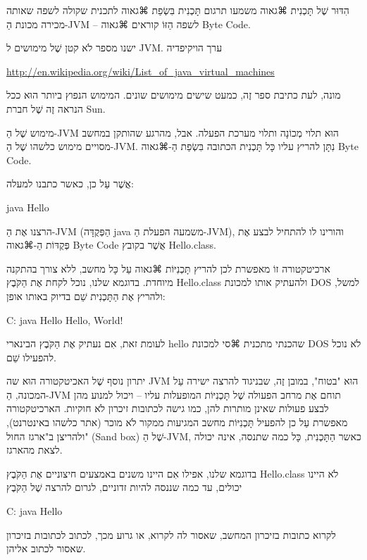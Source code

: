 הִדּוּר שֶׁל תָּכְנִית ⌘גאוה משמעו תרגום תָּכְנִית בִּשְׂפַת ⌘גאוה לתכנית שקולה
לשפה שאותה מכירה מכונת הַ-JVM – לשפה הַזּוֹ קוראים ⌘גאוה Byte Code.

ישנו מספר לֹא קטן שֶׁל מימושים ל JVM. ערך הויקיפדיה
\begin{english}
\url{http://en.wikipedia.org/wiki/List_of_java_virtual_machines}
\end{english}

מונה, לעת כתיבת ספר זֶה, כמעט שישים מימושים שונים. המימוש הנפוץ ביותר הוּא ככל
הנראה זֶה שֶׁל חברת Sun.

מימוש שֶׁל הַ-JVM הוּא תלוי מְכוֹנָה ותלוי מערכת הפעלה. אבל, מהרגע שהותקן במחשב
מסויים מימוש כלשהו שֶׁל הַ-JVM. נִתָּן להריץ עליו כָּל תָּכְנִית הכתובה
בִּשְׂפַת הַ-⌘גאוה Byte Code.



אֲשֶׁר עַל כן, כאשר כתבנו למעלה:

java Hello
\END

הרצנו אֶת הַ-JVM (הַפְּקֻדָּה java משמעה הפעלת הַ-JVM), והורינו לו להתחיל לבצע
אֶת פְּקֻדּוֹת הַ-⌘גאוה Byte Code אֲשֶׁר בקובץ Hello.class.

ארכיטקטורה זוֹ מאפשרת לכן להריץ תָּכְנִיּוֹת ⌘גאוה עַל כָּל מחשב, ללא צורך בהתקנה
מיוחדת. בדוגמא שלנו, נוכל לקחת אֶת הַקֹּבֶץ  Hello.class ולהעתיק אותו למכונת DOS
למשל, ולהריץ אֶת הַתָּכְנִית שֵׁם בדיוק באותו אופן:


\begin{NONE}
C:\> java Hello
Hello, World!
\end{NONE}

לעומת זאת, אִם נעתיק אֶת הַקֹּבֶץ הבינארי hello שהכנתי מתכנית  ⌘סי למכונת DOS לֹא
נוכל להפעילו שֵׁם.

יתרון נוסף שֶׁל האכיטקטורה הוּא שה JVM הוּא "בטוח", במובן זֶה, שבניגוד להרצה
ישירה עַל המכונה, הַ-JVM תוחם אֶת מרחב הפעולה שֶׁל תָּכְנִיּוֹת המופעלות עליו –
ויכול למנוע מהן לבצע פעולות שאינן מותרות להן, כמו גישה לכתובות זיכרון לֹא
חוקיות. הארכיטקטורה מאפשרת עַל כן להפעיל תָּכְנִיּוֹת מחשב המגיעות ממקור לֹא
מוכר (אתר כלשהו באינטרנט), ולהריצן ב"ארגז החול" (Sand box) שֶׁל הַ-JVM, כאשר
הַתָּכְנִית, כָּל כמה שתנסה, אינה יכולה לצאת מהארגז.

בדוגמא שלנו, אפילו אִם היינו משנים באמצעים חיצוניים אֶת הַקֹּבֶץ Hello.class לֹא
היינו יכולים, עד כמה שננסה להיות זדוניים, לגרום להרצה שֶׁל הַקֹּבֶץ
\begin{NONE}
C:\> java Hello
\end{NONE}

לקרוא כתובות בזיכרון המחשב, שאסור לה לקרוא, או גרוע מכך, לכתוב לכתובות בזיכרון
שאסור לכתוב אליהן.

